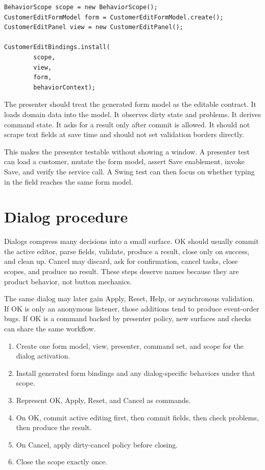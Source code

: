 \begin{lstlisting}[caption={Generated bindings install routine form behavior.}]
BehaviorScope scope = new BehaviorScope();
CustomerEditFormModel form = CustomerEditFormModel.create();
CustomerEditPanel view = new CustomerEditPanel();

CustomerEditBindings.install(
        scope,
        view,
        form,
        behaviorContext);
\end{lstlisting}

The presenter should treat the generated form model as the editable contract. It loads domain data into the model. It observes dirty state and problems. It derives command state. It asks for a result only after commit is allowed. It should not scrape text fields at save time and should not set validation borders directly.

This makes the presenter testable without showing a window. A presenter test can load a customer, mutate the form model, assert Save enablement, invoke Save, and verify the service call. A Swing test can then focus on whether typing in the field reaches the same form model.

\section{Dialog procedure}

Dialogs compress many decisions into a small surface. OK should usually commit the active editor, parse fields, validate, produce a result, close only on success, and clean up. Cancel may discard, ask for confirmation, cancel tasks, close scopes, and produce no result. These steps deserve names because they are product behavior, not button mechanics.

The same dialog may later gain Apply, Reset, Help, or asynchronous validation. If OK is only an anonymous listener, those additions tend to produce event-order bugs. If OK is a command backed by presenter policy, new surfaces and checks can share the same workflow.

\begin{enumerate}
\item Create one form model, view, presenter, command set, and scope for the dialog activation.
\item Install generated form bindings and any dialog-specific behaviors under that scope.
\item Represent OK, Apply, Reset, and Cancel as commands.
\item On OK, commit active editing first, then commit fields, then check problems, then produce the result.
\item On Cancel, apply dirty-cancel policy before closing.
\item Close the scope exactly once.
\end{enumerate}

